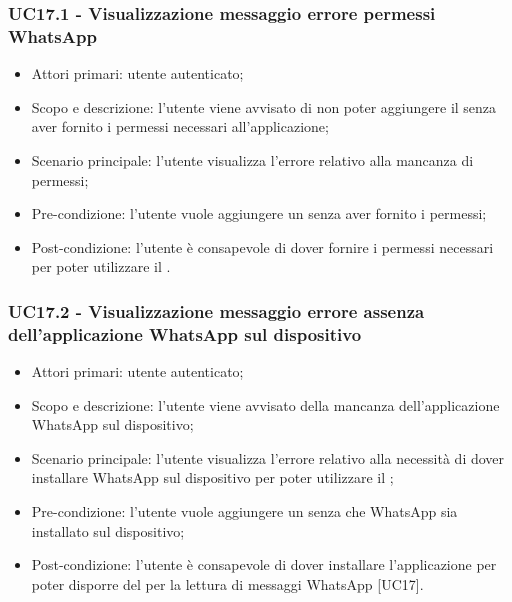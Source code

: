 \subsubsection{UC17.1 - Visualizzazione messaggio errore permessi WhatsApp}
\begin{itemize}
	\item  Attori primari: utente autenticato;
	\item  Scopo e descrizione: l'utente viene avvisato di non poter aggiungere il  senza aver fornito i permessi necessari all'applicazione;
	\item  Scenario principale: l'utente visualizza l'errore relativo alla mancanza di permessi;
	\item  Pre-condizione: l'utente vuole aggiungere un  senza aver fornito i permessi;
	\item  Post-condizione: l'utente è consapevole di dover fornire i permessi necessari per poter utilizzare il .
\end{itemize}
\subsubsection{UC17.2 - Visualizzazione messaggio errore assenza dell'applicazione WhatsApp sul dispositivo}
\begin{itemize}
	\item  Attori primari: utente autenticato;
	\item  Scopo e descrizione: l'utente viene avvisato della mancanza dell'applicazione WhatsApp sul dispositivo;
	\item  Scenario principale: l'utente visualizza l'errore relativo alla necessità di dover installare WhatsApp sul dispositivo per poter utilizzare il ;
	\item  Pre-condizione: l'utente vuole aggiungere un  senza che WhatsApp sia installato sul dispositivo;
	\item  Post-condizione: l'utente è consapevole di dover installare l'applicazione per poter disporre del  per la lettura di messaggi WhatsApp [UC17].
\end{itemize}
